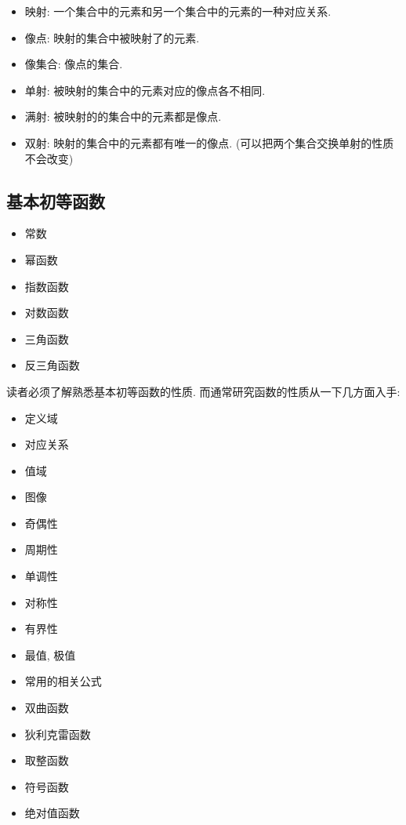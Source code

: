 \begin{definition}[映射]
    \begin{itemize}
        \item 映射: 一个集合中的元素和另一个集合中的元素的一种对应关系. 
        \item 像点: 映射的集合中被映射了的元素. 
        \item 像集合: 像点的集合. 
        \item 单射: 被映射的集合中的元素对应的像点各不相同. 
        \item 满射: 被映射的的集合中的元素都是像点. 
        \item 双射: 映射的集合中的元素都有唯一的像点. (可以把两个集合交换单射的性质不会改变)
    \end{itemize}
\end{definition}

\subsection{基本初等函数}

\begin{definition}[基本初等函数]
    \begin{itemize}
        \item 常数
        \item 幂函数
        \item 指数函数
        \item 对数函数
        \item 三角函数
        \item 反三角函数
    \end{itemize}
\end{definition}
\begin{comment}
    基本初等函数很重要, 在之后的学习中几乎所有函数都可以使用基本初等函数经过有限次的基本运算接近, 是今后研究函数的基础.
\end{comment}

读者必须了解熟悉基本初等函数的性质. 
而通常研究函数的性质从一下几方面入手: 
\begin{itemize}
    \item 定义域
    \item 对应关系
    \item 值域
    \item 图像
    \item 奇偶性
    \item 周期性
    \item 单调性
    \item 对称性
    \item 有界性
    \item 最值, 极值
    \item 常用的相关公式
\end{itemize}

\begin{definition}[其他应当熟悉的函数]
    \begin{itemize}
        \item 双曲函数
        \item 狄利克雷函数
        \item 取整函数
        \item 符号函数
        \item 绝对值函数
    \end{itemize}
\end{definition}